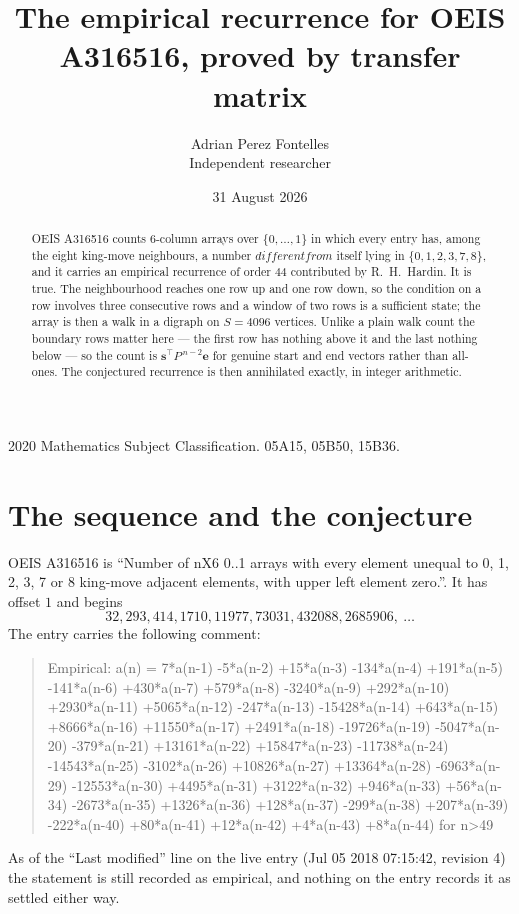 \documentclass[11pt,a4paper]{article}
\title{The empirical recurrence for OEIS A316516, proved by transfer matrix}
\author{Adrian Perez Fontelles\\ \small Independent researcher}
\date{31 August 2026}
\theoremstyle{plain}
\theoremstyle{definition}
\begin{document}
\maketitle

\begin{abstract}
OEIS A316516 counts $6$-column arrays over $\{0,\dots,1\}$ in which every entry has,
among the eight king-move neighbours, a number $different from$ itself lying in $\{0,1,2,3,7,8\}$, and it carries an empirical
recurrence of order $44$ contributed by R.~H.~Hardin. It is true. The neighbourhood
reaches one row up and one row down, so the condition on a row involves three consecutive
rows and a window of two rows is a sufficient state; the array is then a walk in a digraph
on $S=4096$ vertices. Unlike a plain walk count the boundary rows matter here --- the first
row has nothing above it and the last nothing below --- so the count is
$\mathbf{s}^{\!\top}P^{\,n-2}\mathbf{e}$ for genuine start and end vectors rather than
all-ones. The conjectured recurrence is then annihilated exactly, in integer arithmetic.
\end{abstract}

\noindent\small 2020 Mathematics Subject Classification. 05A15, 05B50, 15B36.\normalsize

\section{The sequence and the conjecture}

OEIS A316516 is ``Number of nX6 0..1 arrays with every element unequal to 0, 1, 2, 3, 7 or 8 king-move adjacent elements, with upper left element zero.''. It has offset
$1$ and begins
\[
32, 293, 414, 1710, 11977, 73031, 432088, 2685906,\ \dots
\]
The entry carries the following comment:
\begin{quote}\small
Empirical: a(n) = 7*a(n-1) -5*a(n-2) +15*a(n-3) -134*a(n-4) +191*a(n-5) -141*a(n-6) +430*a(n-7) +579*a(n-8) -3240*a(n-9) +292*a(n-10) +2930*a(n-11) +5065*a(n-12) -247*a(n-13) -15428*a(n-14) +643*a(n-15) +8666*a(n-16) +11550*a(n-17) +2491*a(n-18) -19726*a(n-19) -5047*a(n-20) -379*a(n-21) +13161*a(n-22) +15847*a(n-23) -11738*a(n-24) -14543*a(n-25) -3102*a(n-26) +10826*a(n-27) +13364*a(n-28) -6963*a(n-29) -12553*a(n-30) +4495*a(n-31) +3122*a(n-32) +946*a(n-33) +56*a(n-34) -2673*a(n-35) +1326*a(n-36) +128*a(n-37) -299*a(n-38) +207*a(n-39) -222*a(n-40) +80*a(n-41) +12*a(n-42) +4*a(n-43) +8*a(n-44) for n>49
\end{quote}
As of the ``Last modified'' line on the live entry (Jul 05 2018 07:15:42, revision
4) the statement is still recorded as empirical, and nothing on the entry
records it as settled either way.
\end{document}
